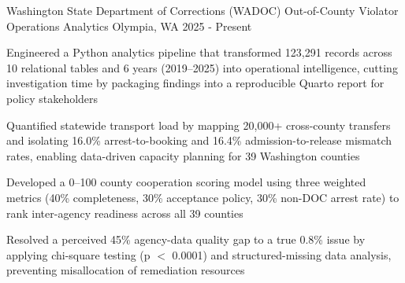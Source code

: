 

\begin{cventries}
  \cventry
  {Washington State Department of Corrections (WADOC)} %
  {Out-of-County Violator Operations Analytics} %
  {Olympia, WA} %
  {2025 - Present} %
  {
    \begin{cvitems} %
      \item {Engineered a Python analytics pipeline that transformed 123,291 records across 10 relational tables and 6 years (2019--2025) into operational intelligence, cutting investigation time by packaging findings into a reproducible Quarto report for policy stakeholders}
      \item {Quantified statewide transport load by mapping 20,000+ cross-county transfers and isolating 16.0\% arrest-to-booking and 16.4\% admission-to-release mismatch rates, enabling data-driven capacity planning for 39 Washington counties}
      \item {Developed a 0--100 county cooperation scoring model using three weighted metrics (40\% completeness, 30\% acceptance policy, 30\% non-DOC arrest rate) to rank inter-agency readiness across all 39 counties}
      \item {Resolved a perceived 45\% agency-data quality gap to a true 0.8\% issue by applying chi-square testing (p $<$ 0.0001) and structured-missing data analysis, preventing misallocation of remediation resources}
    \end{cvitems}
  }


\end{cventries}
